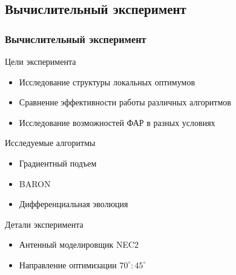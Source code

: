 \subsection{Вычислительный эксперимент}
\begin{frame}
    \frametitle{ Вычислительный эксперимент }
    Цели эксперимента
    \begin{itemize}
      \item Исследование структуры локальных оптимумов
      \item Сравнение эффективности работы различных алгоритмов
      \item Исследование возможностей ФАР в разных условиях
    \end{itemize}
    Исследуемые алгоритмы
    \begin{itemize}
      \item Градиентный подъем
      \item BARON
      \item Дифференциальная эволюция
    \end{itemize}
    Детали эксперимента
    \begin{itemize}
      \item Антенный моделировщик NEC2
      \item Направление оптимизации $70^{\circ}:45^{\circ}$
    \end{itemize}
\end{frame}

